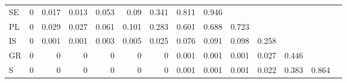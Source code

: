 \begin{table}[H]
\begin{tabular}{lrrrrrrrrrrrrr}
    SE    & 0     & 0.017 & 0.013 & 0.053 & 0.09  & 0.341 & 0.811 & 0.946 &       &       &       &       &  \\
    PL    & 0     & 0.029 & 0.027 & 0.061 & 0.101 & 0.283 & 0.601 & 0.688 & 0.723 &       &       &       &  \\
    IS    & 0     & 0.001 & 0.001 & 0.003 & 0.005 & 0.025 & 0.076 & 0.091 & 0.098 & 0.258 &       &       &  \\
    GR    & 0     & 0     & 0     & 0     & 0     & 0     & 0.001 & 0.001 & 0.001 & 0.027 & 0.446 &       &  \\
    S     & 0     & 0     & 0     & 0     & 0     & 0     & 0.001 & 0.001 & 0.001 & 0.022 & 0.383 & 0.864 &  \\
    \end{tabular}%
  \label{tab:addlabel}%
\end{table}%
